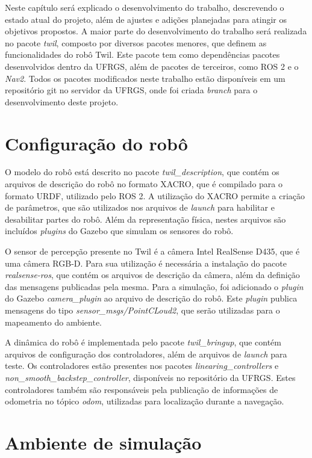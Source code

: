 \documentclass[repeatfields,xlists,xpacks,oneside,yearsonly]{ufrgscca}
\begin{document}
Neste capítulo será explicado o desenvolvimento do trabalho, descrevendo o
estado atual do projeto, além de ajustes e adições planejadas para atingir
os objetivos propostos.
A maior parte do desenvolvimento do trabalho será realizada no pacote \textit{twil},
composto por diversos pacotes menores, que definem as funcionalidades do robô Twil.
Este pacote tem como dependências pacotes desenvolvidos dentro da UFRGS, além de pacotes de terceiros, como
ROS 2 e o \textit{Nav2}.
Todos os pacotes modificados neste trabalho estão disponíveis em um repositório git
no servidor da UFRGS, onde foi criada \textit{branch} para o desenvolvimento
deste projeto.

\section{Configuração do robô}

O modelo do robô está descrito no pacote \textit{twil\_description}, que contém
os arquivos de descrição do robô no formato XACRO, que é compilado para o formato
URDF, utilizado pelo ROS 2.
A utilização do XACRO permite a criação de parâmetros, que são utilizados nos
arquivos de \textit{launch} para habilitar e desabilitar partes do robô.
Além da representação física, nestes arquivos são incluídos \textit{plugins}
do Gazebo que simulam os sensores do robô.

O sensor de percepção presente no Twil é a câmera Intel RealSense D435, que
é uma câmera RGB-D.
Para sua utilização é necessária a instalação do pacote
\textit{realsense-ros}\cite{realsense_ros}, que contém os arquivos de
descrição da câmera, além da definição das mensagens publicadas pela mesma.
Para a simulação, foi adicionado o \textit{plugin} do Gazebo
\textit{camera\_plugin} ao arquivo de descrição do robô.
Este \textit{plugin} publica mensagens do tipo \textit{sensor\_msgs/PointCLoud2}, que
serão utilizadas para o mapeamento do ambiente.

A dinâmica do robô é implementada pelo pacote \textit{twil\_bringup},
que contém arquivos de configuração dos controladores, além de arquivos de
\textit{launch} para teste.
Os controladores estão presentes nos pacotes \textit{linearing\_controllers} e
\textit{non\_smooth\_backstep\_controller}, disponíveis no repositório da UFRGS.
Estes controladores também são responsáveis pela publicação de
informações de odometria no tópico \textit{odom}, utilizadas para localização
durante a navegação.

\section{Ambiente de simulação}
\end{document}
